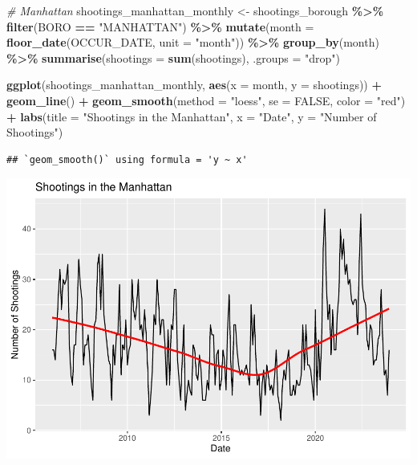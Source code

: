 \documentclass[
]{article}
\newenvironment{Shaded}{\begin{snugshade}}{\end{snugshade}}
\newcommand{\AttributeTok}[1]{\textcolor[rgb]{0.13,0.29,0.53}{#1}}
\newcommand{\CommentTok}[1]{\textcolor[rgb]{0.56,0.35,0.01}{\textit{#1}}}
\newcommand{\ConstantTok}[1]{\textcolor[rgb]{0.56,0.35,0.01}{#1}}
\newcommand{\FunctionTok}[1]{\textcolor[rgb]{0.13,0.29,0.53}{\textbf{#1}}}
\newcommand{\NormalTok}[1]{#1}
\newcommand{\OtherTok}[1]{\textcolor[rgb]{0.56,0.35,0.01}{#1}}
\newcommand{\SpecialCharTok}[1]{\textcolor[rgb]{0.81,0.36,0.00}{\textbf{#1}}}
\newcommand{\StringTok}[1]{\textcolor[rgb]{0.31,0.60,0.02}{#1}}
\begin{document}
\begin{Shaded}
\begin{Highlighting}[]
\CommentTok{\# Manhattan}
\NormalTok{shootings\_manhattan\_monthly }\OtherTok{\textless{}{-}}\NormalTok{ shootings\_borough }\SpecialCharTok{\%\textgreater{}\%}
  \FunctionTok{filter}\NormalTok{(BORO }\SpecialCharTok{==} \StringTok{"MANHATTAN"}\NormalTok{) }\SpecialCharTok{\%\textgreater{}\%}
  \FunctionTok{mutate}\NormalTok{(}\AttributeTok{month =} \FunctionTok{floor\_date}\NormalTok{(OCCUR\_DATE, }\AttributeTok{unit =} \StringTok{"month"}\NormalTok{)) }\SpecialCharTok{\%\textgreater{}\%}
  \FunctionTok{group\_by}\NormalTok{(month) }\SpecialCharTok{\%\textgreater{}\%}
  \FunctionTok{summarise}\NormalTok{(}\AttributeTok{shootings =} \FunctionTok{sum}\NormalTok{(shootings), }\AttributeTok{.groups =} \StringTok{"drop"}\NormalTok{)}

\FunctionTok{ggplot}\NormalTok{(shootings\_manhattan\_monthly, }\FunctionTok{aes}\NormalTok{(}\AttributeTok{x =}\NormalTok{ month, }\AttributeTok{y =}\NormalTok{ shootings)) }\SpecialCharTok{+}
  \FunctionTok{geom\_line}\NormalTok{() }\SpecialCharTok{+}
  \FunctionTok{geom\_smooth}\NormalTok{(}\AttributeTok{method =} \StringTok{"loess"}\NormalTok{, }\AttributeTok{se =} \ConstantTok{FALSE}\NormalTok{, }\AttributeTok{color =} \StringTok{"red"}\NormalTok{) }\SpecialCharTok{+}
  \FunctionTok{labs}\NormalTok{(}\AttributeTok{title =} \StringTok{"Shootings in the Manhattan"}\NormalTok{,}
       \AttributeTok{x =} \StringTok{"Date"}\NormalTok{,}
       \AttributeTok{y =} \StringTok{"Number of Shootings"}\NormalTok{)}
\end{Highlighting}
\end{Shaded}

\begin{verbatim}
## `geom_smooth()` using formula = 'y ~ x'
\end{verbatim}

\includegraphics{nypd-shooting-data-analysis_files/figure-latex/trend-shootings-manhattan-1.pdf}
\end{document}
